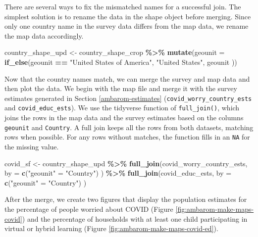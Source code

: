 \documentclass[
]{krantz}
\makeatletter
\newenvironment{Shaded}{\begin{snugshade}}{\end{snugshade}}
\newcommand{\AttributeTok}[1]{\textcolor[rgb]{0.27,0.27,0.27}{#1}}
\newcommand{\FunctionTok}[1]{\textcolor[rgb]{0.27,0.27,0.27}{\textbf{#1}}}
\newcommand{\NormalTok}[1]{#1}
\newcommand{\OtherTok}[1]{\textcolor[rgb]{0.37,0.37,0.37}{#1}}
\newcommand{\SpecialCharTok}[1]{\textcolor[rgb]{0.43,0.43,0.43}{\textbf{#1}}}
\newcommand{\StringTok}[1]{\textcolor[rgb]{0.5,0.5,0.5}{#1}}
\newenvironment{kframe}{%
\medskip{}
\setlength{\fboxsep}{.8em}
 \def\at@end@of@kframe{}%
 \ifinner\ifhmode%
  \def\at@end@of@kframe{\end{minipage}}%
  \begin{minipage}{\columnwidth}%
 \fi\fi%
 \def\FrameCommand##1{\hskip\@totalleftmargin \hskip-\fboxsep
 \colorbox{shadecolor}{##1}\hskip-\fboxsep
     \hskip-\linewidth \hskip-\@totalleftmargin \hskip\columnwidth}%
 \MakeFramed {\advance\hsize-\width
   \@totalleftmargin\z@ \linewidth\hsize
   \@setminipage}}%
 {\par\unskip\endMakeFramed%
 \at@end@of@kframe}
\renewenvironment{Shaded}{\begin{kframe}}{\end{kframe}}
\makeatother
\begin{document}
There are several ways to fix the mismatched names for a successful join. The simplest solution is to rename the data in the shape object before merging. Since only one country name in the survey data differs from the map data, we rename the map data accordingly.

\begin{Shaded}
\begin{Highlighting}[]
\NormalTok{country\_shape\_upd }\OtherTok{\textless{}{-}}\NormalTok{ country\_shape\_crop }\SpecialCharTok{\%\textgreater{}\%}
  \FunctionTok{mutate}\NormalTok{(}\AttributeTok{geounit =} \FunctionTok{if\_else}\NormalTok{(geounit }\SpecialCharTok{==} \StringTok{"United States of America"}\NormalTok{,}
    \StringTok{"United States"}\NormalTok{, geounit}
\NormalTok{  ))}
\end{Highlighting}
\end{Shaded}

Now that the country names match, we can merge the survey and map data and then plot the data. We begin with the map file and merge it with the survey estimates generated in Section \ref{ambarom-estimates} (\texttt{covid\_worry\_country\_ests} and \texttt{covid\_educ\_ests}). We use the tidyverse function of \texttt{full\_join()}, which joins the rows in the map data and the survey estimates based on the columns \texttt{geounit} and \texttt{Country}. A full join keeps all the rows from both datasets, matching rows when possible. For any rows without matches, the function fills in an \texttt{NA} for the missing value.

\begin{Shaded}
\begin{Highlighting}[]
\NormalTok{covid\_sf }\OtherTok{\textless{}{-}}\NormalTok{ country\_shape\_upd }\SpecialCharTok{\%\textgreater{}\%}
  \FunctionTok{full\_join}\NormalTok{(covid\_worry\_country\_ests,}
    \AttributeTok{by =} \FunctionTok{c}\NormalTok{(}\StringTok{"geounit"} \OtherTok{=} \StringTok{"Country"}\NormalTok{)}
\NormalTok{  ) }\SpecialCharTok{\%\textgreater{}\%}
  \FunctionTok{full\_join}\NormalTok{(covid\_educ\_ests,}
    \AttributeTok{by =} \FunctionTok{c}\NormalTok{(}\StringTok{"geounit"} \OtherTok{=} \StringTok{"Country"}\NormalTok{)}
\NormalTok{  )}
\end{Highlighting}
\end{Shaded}

After the merge, we create two figures that display the population estimates for the percentage of people worried about COVID (Figure \ref{fig:ambarom-make-maps-covid}) and the percentage of households with at least one child participating in virtual or hybrid learning (Figure \ref{fig:ambarom-make-maps-covid-ed}).
\end{document}
